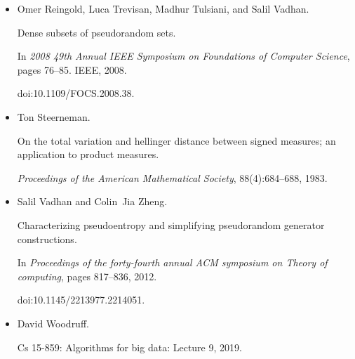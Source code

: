 \begin{itemize}
doi:10.1007/978-3-642-11799-2\_15.





\item[] 
[14]

Omer Reingold, Luca Trevisan, Madhur Tulsiani, and Salil Vadhan.


Dense subsets of pseudorandom sets.


In \emph{2008 49th Annual IEEE Symposium on Foundations of Computer
Science}, pages 76–85. IEEE, 2008.


doi:10.1109/FOCS.2008.38.





\item[] 
[15]

Ton Steerneman.


On the total variation and hellinger distance between signed
measures; an application to product measures.


\emph{Proceedings of the American Mathematical Society},
88(4):684–688, 1983.





\item[] 
[16]

Salil Vadhan and Colin Jia Zheng.


Characterizing pseudoentropy and simplifying pseudorandom generator
constructions.


In \emph{Proceedings of the forty-fourth annual ACM symposium on
Theory of computing}, pages 817–836, 2012.


doi:10.1145/2213977.2214051.





\item[] 
[17]

David Woodruff.


Cs 15-859: Algorithms for big data: Lecture 9, 2019.





\end{itemize}

